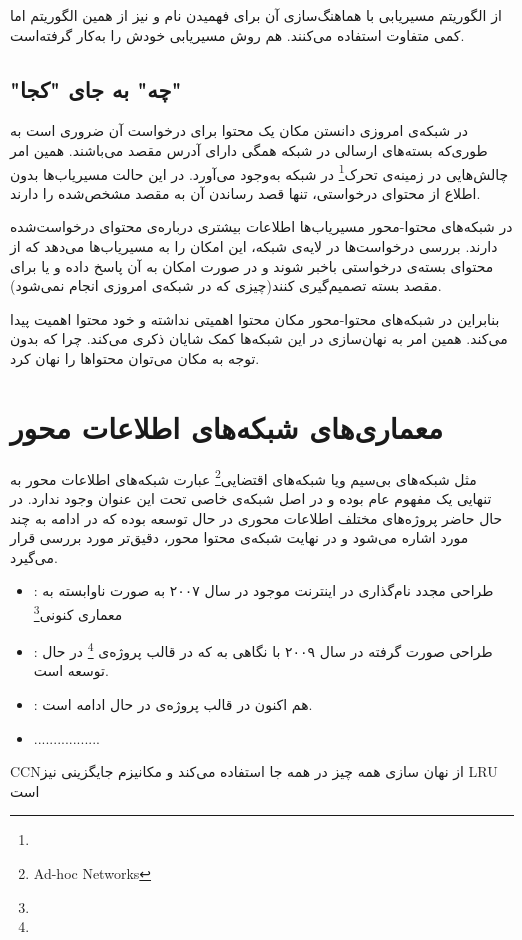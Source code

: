  از الگوریتم مسیریابی 
با هماهنگ‌سازی آن برای فهمیدن نام و  نیز از همین الگوریتم اما کمی متفاوت استفاده می‌کنند.
 هم روش مسیریابی خودش را به‌کار گرفته‌است.


\subsection{"چه" به جای "کجا"}

در شبکه‌ی امروزی دانستن مکان یک محتوا برای درخواست آن ضروری است به طوری‌که بسته‌های ارسالی در شبکه همگی دارای آدرس  مقصد می‌باشند. همین امر چالش‌هایی در زمینه‌ی تحرک\footnote{} در شبکه به‌وجود می‌آورد. در این حالت مسیریاب‌ها بدون اطلاع از محتوای درخواستی، تنها قصد رساندن آن به مقصد مشخص‌شده را دارند.

در شبکه‌های محتوا-محور مسیریاب‌ها اطلاعات بیشتری درباره‌ی محتوای درخواست‌شده دارند. بررسی درخواست‌ها در لایه‌ی شبکه، این امکان را به مسیریاب‌ها می‌دهد که از محتوای بسته‌ی درخواستی با‌خبر شوند و در صورت امکان به آن پاسخ داده و یا برای مقصد بسته تصمیم‌گیری کنند(چیزی که در شبکه‌ی امروزی انجام نمی‌شود).

بنابراین در شبکه‌های محتوا-محور مکان محتوا اهمیتی نداشته و خود محتوا اهمیت پیدا می‌کند. همین امر به نهان‌سازی در این شبکه‌ها کمک شایان ذکری می‌کند. چرا که بدون توجه به مکان می‌توان محتواها را نهان کرد.


\section{معماری‌های شبکه‌های اطلاعات محور}
مثل شبکه‌های بی‌سیم ویا شبکه‌های اقتضایی\footnote{Ad-hoc Networks} عبارت شبکه‌های اطلاعات محور به تنهایی یک مفهوم عام بوده و در اصل شبکه‌ی خاصی تحت این عنوان وجود ندارد. در حال حاضر پروژه‌های مختلف اطلاعات محوری در حال توسعه بوده که در ادامه به چند مورد اشاره می‌شود و در نهایت شبکه‌ی محتوا محور، دقیق‌تر مورد بررسی قرار می‌گیرد.


\begin{itemize}
	\item
	\textbf{}\cite{dona}: طراحی مجدد نام‌گذاری در اینترنت موجود در سال ۲۰۰۷ به صورت ناوابسته به معماری کنونی\footnote{} 
	
	\item
	\textbf{}\cite{ndn}: طراحی صورت گرفته در سال ۲۰۰۹ با نگاهی به  که در قالب پروژه‌ی \footnote{} در حال توسعه است.
	
	\item
	\textbf{}\cite{pursuit}: هم اکنون در قالب پروژه‌ی  در حال ادامه است.
	
	\item
	.................
	
	
\end{itemize}


CCN‌از نهان سازی همه چیز در همه جا استفاده می‌کند و مکانیزم جایگزینی نیز LRU است
